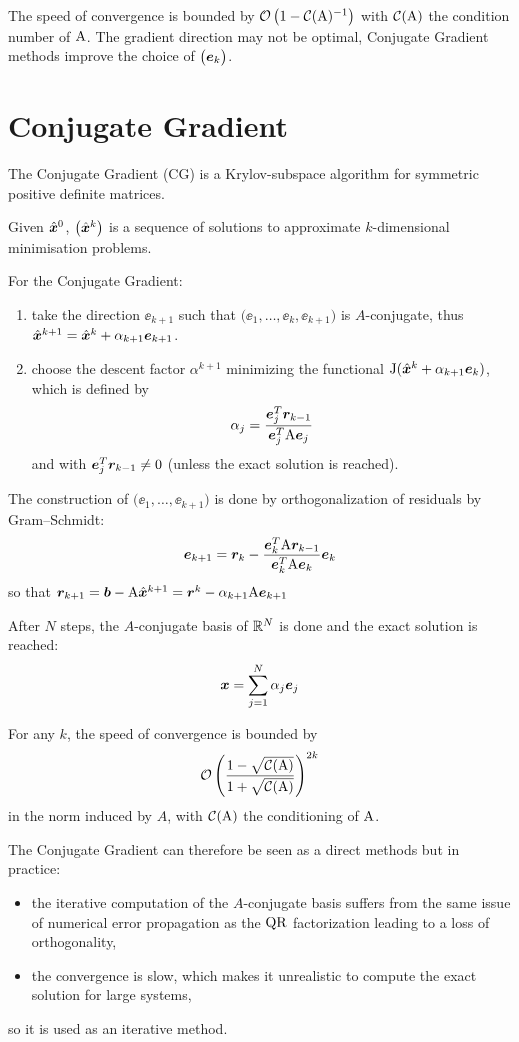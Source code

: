 \medskip
The speed of convergence is bounded by $\mathcal{O}\left(1- \mathcal{C}({\mathrm A})^{-1}\right)$ with $\mathcal{C}({\mathrm A})$ the condition number of ${\mathrm A}$.
The gradient direction may not be optimal, Conjugate Gradient methods improve the choice of $\bigl({\boldsymbol e}_k\bigr)$.

\section{Conjugate Gradient}

The Conjugate Gradient (CG) is a Krylov-subspace algorithm for symmetric positive definite matrices.

\medskip
Given $\hat{\boldsymbol x}^0$, $\bigl(\hat{\boldsymbol x}^k\bigr)$ is a sequence of solutions to approximate $k$-dimensional minimisation problems.

\medskip
For the Conjugate Gradient:
\begin{enumerate}
\item take the direction $\ee_{k+1}$ such that $\bigl(\ee_1, \dots, \ee_{k}, \ee_{k+1}\bigr)$ is $A$-conjugate, thus $\hat{\boldsymbol x}^{k+1} = \hat{\boldsymbol x}^{k} + \alpha_{k+1} {\boldsymbol e}_{k+1}$.
\item choose the descent factor $\alpha^{k+1}$ minimizing the functional ${\mathrm J}(\hat{\boldsymbol x}^{k} + \alpha_{k+1} {\boldsymbol e}_k)$, which is defined by
\[
\alpha_j = \frac{{\boldsymbol e}^T_j{\boldsymbol r}_{k-1}}{{\boldsymbol e}^T_j{\mathrm A}{\boldsymbol e}_j}
\]
and with ${\boldsymbol e}^T_j{\boldsymbol r}_{k-1} \neq 0$ (unless the exact solution is reached).
\end{enumerate}

\medskip
The construction of $\bigl(\ee_1, \dots, \ee_{k+1}\bigr)$ is done by orthogonalization of residuals by Gram--Schmidt:
\[
{\boldsymbol e}_{k+1} = {\boldsymbol r}_k - \frac{{\boldsymbol e}^T_k{\mathrm A}{\boldsymbol r}_{k-1}}{{\boldsymbol e}^T_k{\mathrm A}{\boldsymbol e}_k}{\boldsymbol e}_k
\]
so that ${\boldsymbol r}_{k+1} = {\boldsymbol b} - {\mathrm A}\hat{\boldsymbol x}^{k+1} = {\boldsymbol r}^k - \alpha_{k+1}{\mathrm A}{\boldsymbol e}_{k+1}$

\medskip
After $N$ steps, the $A$-conjugate basis of ${\mathbb{R}^N}$ is done and the exact solution is reached:
\[
 {\boldsymbol x} = \sum_{j=1}^N \alpha_j {\boldsymbol e}_j
\]

\medskip
For any $k$, the speed of convergence is bounded by
\[
\mathcal{O}\left( \frac{ 1-\sqrt{\mathcal{C}({\mathrm A})} } { 1+\sqrt{\mathcal{C}({\mathrm A})} } \right)^{2k}
\]
in the norm induced by $A$, with $\mathcal{C}({\mathrm A})$ the conditioning of ${\mathrm A}$.

\medskip
The Conjugate Gradient can therefore be seen as a direct methods but in practice:
\begin{itemize}
\item the iterative computation of the $A$-conjugate basis suffers from the same issue of numerical error propagation as the ${\mathrm Q}{\mathrm R}$ factorization leading to a loss of orthogonality,
\item the convergence is slow, which makes it unrealistic to compute the exact solution for large systems,
\end{itemize}
so it is used as an iterative method.

